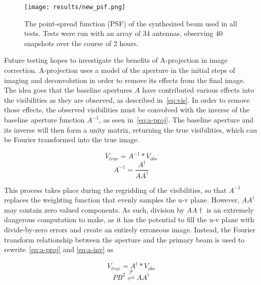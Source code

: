 \documentclass[11pt]{article}
\begin{document}
\begin{figure}
    \centering
    \texttt{[image: results/new\_psf.png]}
    \caption{
        The point-spread function (PSF) of the synthesized beam used in all 
        tests.  Tests were run with an array of 34 antennas, observing 40 
        snapshots over the course of 2 hours.
    }
    \label{fig:psf}
\end{figure}

Future testing hopes to investigate the benefits of A-projection in image 
correction.
A-projection uses a model of the aperture in the initial steps of imaging and 
deconvolution in order to remove its effects from the final image. The idea 
goes that the baseline apertures $A$ have contributed various effects into the 
visibilities as they are observed, as described in~\eqref{eq:vis}. In order to 
remove those effects, the observed visibilities must be convolved with the 
inverse of the baseline aperture function $A^{-1}$, as seen 
in~\eqref{eq:a-proj}. The baseline aperture and its inverse will then form a 
unity matrix, returning the true visibilities, which can be Fourier transformed 
into the true image.

\begin{equation}
    \label{eq:a-proj}
    V_{true} = A^{-1} * V_{obs}
\end{equation}
\begin{equation}
    \label{eq:a-inv}
    A^{-1} = \frac{A^{\dagger}}{AA^{\dagger}}
\end{equation}

This process takes place during the regridding of the visibilities, so that 
$A^{-1}$ replaces the weighting function that evenly samples the u-v plane.  
However, $AA^{\dagger}$ may contain zero valued components. As such, division 
by $AA{\dagger}$ is an extremely dangerous computation to make, as it has the 
potential to fill the u-v plane with divide-by-zero errors and create an 
entirely erroneous image. Instead, the Fourier transform relationship between 
the aperture and the primary beam is used to rewrite~\eqref{eq:a-proj} and 
\eqref{eq:a-inv} as

\begin{equation}
    \label{eq:a-proj-cor}
    V_{true} = A^{\dagger} * V_{obs}
\end{equation}
\begin{equation}
    \label{eq:imcor}
    PB^2 \overset{\mathcal{F}}{\rightleftharpoons} AA^{\dagger}
\end{equation}
\end{document}
